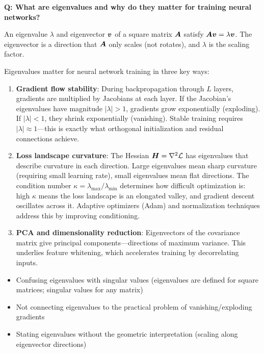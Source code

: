 \begin{interviewq}
\textbf{Q: What are eigenvalues and why do they matter for training neural networks?}

 \quad {} \quad \badgefreq{\freqmed}

\stronganswer
An eigenvalue $\lambda$ and eigenvector $\bm{v}$ of a square matrix $\bm{A}$ satisfy $\bm{A} \bm{v} = \lambda \bm{v}$. The eigenvector is a direction that $\bm{A}$ only scales (not rotates), and $\lambda$ is the scaling factor.

Eigenvalues matter for neural network training in three key ways:

\begin{enumerate}
    \item \textbf{Gradient flow stability}: During backpropagation through $L$ layers, gradients are multiplied by Jacobians at each layer. If the Jacobian's eigenvalues have magnitude $|\lambda| > 1$, gradients grow exponentially (exploding). If $|\lambda| < 1$, they shrink exponentially (vanishing). Stable training requires $|\lambda| \approx 1$---this is exactly what orthogonal initialization and residual connections achieve.

    \item \textbf{Loss landscape curvature}: The Hessian $\bm{H} = \nabla^2 \mathcal{L}$ has eigenvalues that describe curvature in each direction. Large eigenvalues mean sharp curvature (requiring small learning rate), small eigenvalues mean flat directions. The condition number $\kappa = \lambda_{\max}/\lambda_{\min}$ determines how difficult optimization is: high $\kappa$ means the loss landscape is an elongated valley, and gradient descent oscillates across it. Adaptive optimizers (Adam) and normalization techniques address this by improving conditioning.

    \item \textbf{PCA and dimensionality reduction}: Eigenvectors of the covariance matrix give principal components---directions of maximum variance. This underlies feature whitening, which accelerates training by decorrelating inputs.
\end{enumerate}

\redflags
\begin{itemize}
    \item Confusing eigenvalues with singular values (eigenvalues are defined for square matrices; singular values for any matrix)
    \item Not connecting eigenvalues to the practical problem of vanishing/exploding gradients
    \item Stating eigenvalues without the geometric interpretation (scaling along eigenvector directions)
\end{itemize}


\end{interviewq}
